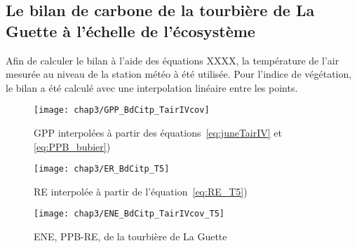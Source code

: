 \subsection{Le bilan de carbone de la tourbière de La Guette à l'échelle de l'écosystème}


Afin de calculer le bilan à l'aide des équations XXXX, la température de l'air mesurée au niveau de la station météo à été utilisée.
Pour l'indice de végétation, le bilan a été calculé avec une interpolation linéaire entre les points.

\begin{figure}
\centering
\texttt{[image: chap3/GPP\_BdCitp\_TairIVcov]}
\caption{GPP interpolées à partir des équations~\ref{eq:juneTairIV} et \ref{eq:PPB_bubier})}
\label{fig:ENE_BdC_TairIVcov-T5}
\end{figure}

\begin{figure}
\centering
\texttt{[image: chap3/ER\_BdCitp\_T5]}
\caption{RE interpolée à partir de l'équation~\ref{eq:RE_T5})}
\label{fig:RE_BdC_T5}
\end{figure}

\begin{figure}
\centering
\texttt{[image: chap3/ENE\_BdCitp\_TairIVcov\_T5]}
\caption{ENE, PPB-RE, de la tourbière de La Guette}
\label{fig:PPB_BdC_TairIVcov}
\end{figure}





